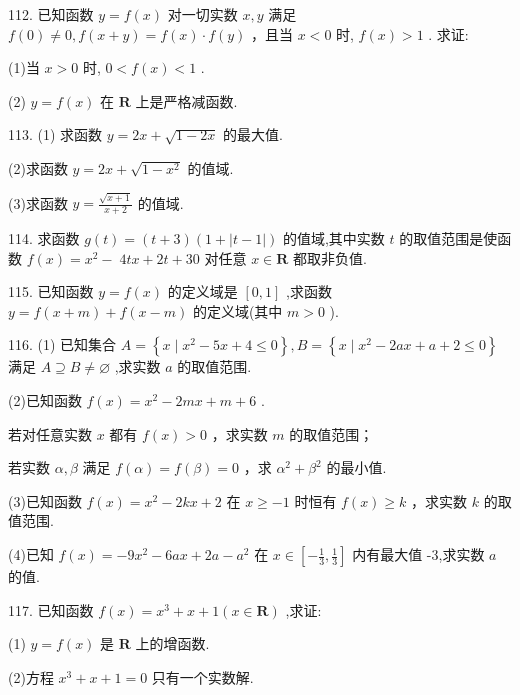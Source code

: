 \documentclass[10pt]{article}
\newcommand*\circled[1]{\tikz[baseline=(char.base)]{\node[shape=circle,draw,inner sep=1.5pt] (char) {\small #1};}}
\begin{document}
112. 已知函数 \(y = f\left( x\right)\) 对一切实数 \(x,y\) 满足 \(f\left( 0\right)  \neq  0,f\left( {x + y}\right)  = f\left( x\right)  \cdot  f\left( y\right)\) ，且当 \(x < 0\) 时, \(f\left( x\right)  > 1\) . 求证:

(1)当 \(x > 0\) 时, \(0 < f\left( x\right)  < 1\) .

(2) \(y = f\left( x\right)\) 在 \(\mathbf{R}\) 上是严格减函数.

113. (1) 求函数 \(y = {2x} + \sqrt{1 - {2x}}\) 的最大值.

(2)求函数 \(y = {2x} + \sqrt{1 - {x}^{2}}\) 的值域.

(3)求函数 \(y = \frac{\sqrt{x + 1}}{x + 2}\) 的值域.

114. 求函数 \(g\left( t\right)  = \left( {t + 3}\right) \left( {1 + \left| {t - 1}\right| }\right)\) 的值域,其中实数 \(t\) 的取值范围是使函数 \(f\left( x\right)  = {x}^{2} - \; {4tx} + {2t} + {30}\) 对任意 \(x \in  \mathbf{R}\) 都取非负值.

115. 已知函数 \(y = f\left( x\right)\) 的定义域是 \(\left\lbrack  {0,1}\right\rbrack\) ,求函数 \(y = f\left( {x + m}\right)  + f\left( {x - m}\right)\) 的定义域(其中 \(m > 0\) ).

116. (1) 已知集合 \(A = \left\{  {x \mid  {x}^{2} - {5x} + 4 \leq  0}\right\}  ,B = \left\{  {x \mid  {x}^{2} - {2ax} + a + 2 \leq  0}\right\}\) 满足 \(A \supseteq  B \neq  \varnothing\) ,求实数 \(a\) 的取值范围.

(2)已知函数 \(f\left( x\right)  = {x}^{2} - {2mx} + m + 6\) .

 \circled{1} 若对任意实数 \(x\) 都有 \(f\left( x\right)  > 0\) ，求实数 \(m\) 的取值范围；

 \circled{2} 若实数 \(\alpha ,\beta\) 满足 \(f\left( \alpha \right)  = f\left( \beta \right)  = 0\) ，求 \({\alpha }^{2} + {\beta }^{2}\) 的最小值.

(3)已知函数 \(f\left( x\right)  = {x}^{2} - {2kx} + 2\) 在 \(x \geq   - 1\) 时恒有 \(f\left( x\right)  \geq  k\) ，求实数 \(k\) 的取值范围.

(4)已知 \(f\left( x\right)  =  - 9{x}^{2} - {6ax} + {2a} - {a}^{2}\) 在 \(x \in  \left\lbrack  {-\frac{1}{3},\frac{1}{3}}\right\rbrack\) 内有最大值 -3,求实数 \(a\) 的值.

117. 已知函数 \(f\left( x\right)  = {x}^{3} + x + 1\left( {x \in  \mathbf{R}}\right)\) ,求证:

(1) \(y = f\left( x\right)\) 是 \(\mathbf{R}\) 上的增函数.

(2)方程 \({x}^{3} + x + 1 = 0\) 只有一个实数解.
\end{document}
